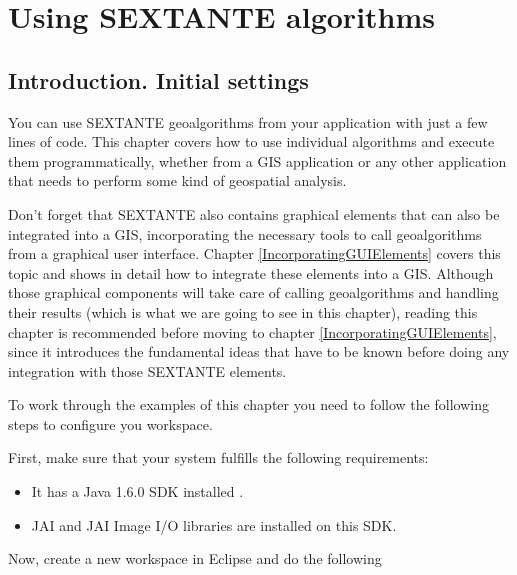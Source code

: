 \chapter{Using SEXTANTE algorithms}\label{UsingGeoalgorithms}

\section{Introduction. Initial settings}

You can use SEXTANTE geoalgorithms from your application with just a few lines of code. This chapter covers how to use individual algorithms and execute them programmatically, whether from a GIS application or any other application that needs to perform some kind of geospatial analysis.

Don't forget that SEXTANTE also contains graphical elements that can also be integrated into a GIS, incorporating the necessary tools to call geoalgorithms from a graphical user interface. Chapter \ref{IncorporatingGUIElements} covers this topic and shows in detail how to integrate these elements into a GIS. Although those graphical components will take care of calling geoalgorithms and handling their results (which is what we are going to see in this chapter), reading this chapter is recommended before moving to chapter \ref{IncorporatingGUIElements}, since it introduces the fundamental ideas that have to be known before doing any integration with those SEXTANTE elements.

To work through the examples of this chapter you need to follow the following steps to configure you workspace.

First, make sure that your system fulfills the following requirements:

\begin{itemize}
	\item It has a Java 1.6.0 SDK installed .
	\item JAI and JAI Image I/O libraries are installed on this SDK.

\end{itemize}

Now, create a new workspace in Eclipse and do the following

